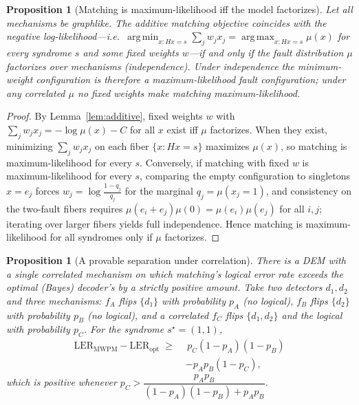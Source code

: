 \documentclass[aps,prxquantum,twocolumn,superscriptaddress,nofootinbib,longbibliography]{revtex4-2}
\newtheorem{proposition}[theorem]{Proposition}
\DeclareMathOperator*{\argmin}{arg\,min}
\DeclareMathOperator*{\argmax}{arg\,max}
\begin{document}
\begin{proposition}[Matching is maximum-likelihood iff the model factorizes]
\label{prop:mwpm-ml}
Let all mechanisms be graphlike. The additive matching objective coincides with
the negative log-likelihood---i.e.\ $\argmin_{x:Hx=s}\sum_j w_j x_j=\argmax_{x:Hx=s}\mu(x)$
for every syndrome $s$ and some fixed weights $w$---if and only if the fault
distribution $\mu$ factorizes over mechanisms (independence). Under independence
the minimum-weight configuration is therefore a maximum-likelihood fault
configuration; under any correlated $\mu$ no fixed weights make matching
maximum-likelihood.
\end{proposition}

\begin{proof}
By Lemma~\ref{lem:additive}, fixed weights $w$ with
$\sum_j w_j x_j=-\log\mu(x)-C$ for all $x$ exist iff $\mu$ factorizes. When they
exist, minimizing $\sum_j w_j x_j$ on each fiber $\{x:Hx=s\}$ maximizes $\mu(x)$,
so matching is maximum-likelihood for every $s$. Conversely, if matching with
fixed $w$ is maximum-likelihood for every $s$, comparing the empty configuration
to singletons $x=e_j$ forces $w_j=\log\frac{1-q_j}{q_j}$ for the marginal
$q_j=\mu(x_j{=}1)$, and consistency on the two-fault fibers requires
$\mu(e_i+e_j)\mu(0)=\mu(e_i)\mu(e_j)$ for all $i,j$; iterating over larger fibers
yields full independence. Hence matching is maximum-likelihood for all syndromes
only if $\mu$ factorizes.
\end{proof}

\begin{proposition}[A provable separation under correlation]
\label{prop:separation}
There is a DEM with a single correlated mechanism on which matching's logical
error rate exceeds the optimal (Bayes) decoder's by a strictly positive amount.
Take two detectors $d_1,d_2$ and three mechanisms: $f_A$ flips $\{d_1\}$ with
probability $p_A$ (no logical), $f_B$ flips $\{d_2\}$ with probability $p_B$ (no
logical), and a correlated $f_C$ flips $\{d_1,d_2\}$ \emph{and} the logical with
probability $p_C$. For the syndrome $s^\star=(1,1)$,
\begin{equation*}
\begin{aligned}
  \mathrm{LER}_{\mathrm{MWPM}}-\mathrm{LER}_{\mathrm{opt}}\;\ge\;
  &\,p_C(1-p_A)(1-p_B)\\
  &-p_Ap_B(1-p_C),
\end{aligned}
\end{equation*}
which is positive whenever $p_C>\dfrac{p_Ap_B}{(1-p_A)(1-p_B)+p_Ap_B}$.
\end{proposition}
\end{document}
